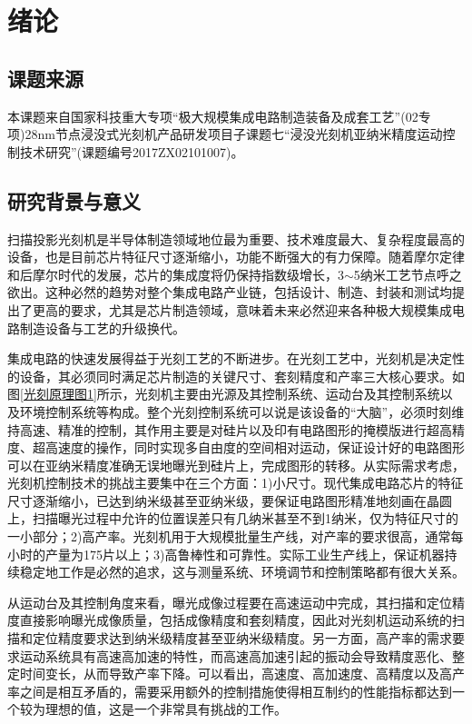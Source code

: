 \chapter{绪论}
\section{课题来源}
本课题来自国家科技重大专项“极大规模集成电路制造装备及成套工艺”(02专项)28nm节点浸没式光刻机产品研发项目子课题七“浸没光刻机亚纳米精度运动控制技术研究”(课题编号2017ZX02101007)。
\section{研究背景与意义}
扫描投影光刻机是半导体制造领域地位最为重要、技术难度最大、复杂程度最高的设备，也是目前芯片特征尺寸逐渐缩小，功能不断强大的有力保障。随着摩尔定律和后摩尔时代的发展，芯片的集成度将仍保持指数级增长，3$\sim$5纳米工艺节点呼之欲出。这种必然的趋势对整个集成电路产业链，包括设计、制造、封装和测试均提出了更高的要求，尤其是芯片制造领域，意味着未来必然迎来各种极大规模集成电路制造设备与工艺的升级换代。

集成电路的快速发展得益于光刻工艺的不断进步。在光刻工艺中，光刻机是决定性的设备，其必须同时满足芯片制造的关键尺寸、套刻精度和产率三大核心要求。如图\ref{光刻原理图1}所示，光刻机主要由光源及其控制系统、运动台及其控制系统以及环境控制系统等构成。整个光刻控制系统可以说是该设备的“大脑”，必须时刻维持高速、精准的控制，其作用主要是对硅片以及印有电路图形的掩模版进行超高精度、超高速度的操作，同时实现多自由度的空间相对运动，保证设计好的电路图形可以在亚纳米精度准确无误地曝光到硅片上，完成图形的转移。从实际需求考虑，光刻机控制技术的挑战主要集中在三个方面\cite{butler2011position}：1)小尺寸。现代集成电路芯片的特征尺寸逐渐缩小，已达到纳米级甚至亚纳米级，要保证电路图形精准地刻画在晶圆上，扫描曝光过程中允许的位置误差只有几纳米甚至不到1纳米，仅为特征尺寸的一小部分；2)高产率。光刻机用于大规模批量生产线，对产率的要求很高，通常每小时的产量为175片以上；3)高鲁棒性和可靠性。实际工业生产线上，保证机器持续稳定地工作是必然的追求，这与测量系统、环境调节和控制策略都有很大关系。

从运动台及其控制角度来看，曝光成像过程要在高速运动中完成，其扫描和定位精度直接影响曝光成像质量，包括成像精度和套刻精度，因此对光刻机运动系统的扫描和定位精度要求达到纳米级精度甚至亚纳米级精度。另一方面，高产率的需求要求运动系统具有高速高加速的特性，而高速高加速引起的振动会导致精度恶化、整定时间变长，从而导致产率下降。可以看出，高速度、高加速度、高精度以及高产率之间是相互矛盾的，需要采用额外的控制措施使得相互制约的性能指标都达到一个较为理想的值，这是一个非常具有挑战的工作。

